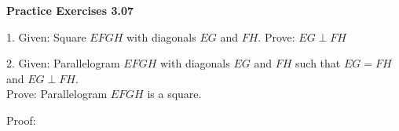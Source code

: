 \vspace{0.3ex}
\noindent\textbf{Practice Exercises 3.07}

\vspace{0.2ex}


\noindent \begin{minipage}[c]{0.35\textwidth}
1. Given: Square \( EFGH \) with diagonals \( EG \) and \( FH \).
Prove: \( EG \perp FH \)
\end{minipage}
\begin{minipage}[c]{0.14\textwidth}

\end{minipage}


% 


\noindent \begin{minipage}[c]{0.35\textwidth}
2. Given: Parallelogram \( EFGH \) with diagonals \( EG \) and \( FH \) such that \( EG = FH \) and \( EG \perp FH \).\\
Prove: Parallelogram \( EFGH \) is a square.
\end{minipage}
\begin{minipage}[c]{0.14\textwidth}

\end{minipage}
\noindent Proof:

\vspace{-.1ex}
\noindent \begin{minipage}[c]{0.49\textwidth}
  
\end{minipage}

\nextcolumn
